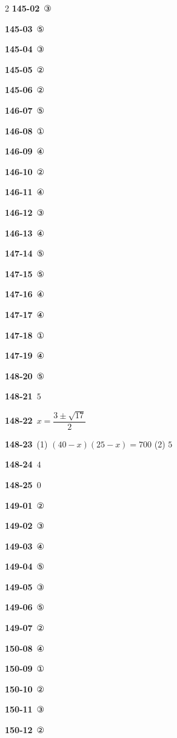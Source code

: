\documentclass[10pt,a4paper]{article}
\begin{document}
\begin{multicols}{2}
\noindent\textbf{145-02}\ ③\par
\noindent\textbf{145-03}\ ⑤\par
\noindent\textbf{145-04}\ ③\par
\noindent\textbf{145-05}\ ②\par
\noindent\textbf{145-06}\ ②\par
\noindent\textbf{146-07}\ ⑤\par
\noindent\textbf{146-08}\ ①\par
\noindent\textbf{146-09}\ ④\par
\noindent\textbf{146-10}\ ②\par
\noindent\textbf{146-11}\ ④\par
\noindent\textbf{146-12}\ ③\par
\noindent\textbf{146-13}\ ④\par
\noindent\textbf{147-14}\ ⑤\par
\noindent\textbf{147-15}\ ⑤\par
\noindent\textbf{147-16}\ ④\par
\noindent\textbf{147-17}\ ④\par
\noindent\textbf{147-18}\ ①\par
\noindent\textbf{147-19}\ ④\par
\noindent\textbf{148-20}\ ⑤\par
\noindent\textbf{148-21}\ $5$\par
\noindent\textbf{148-22}\ $x=\dfrac{3\pm\sqrt{17}}{2}$\par
\noindent\textbf{148-23}\ (1) $(40-x)(25-x)=700$ (2) $5$\par
\noindent\textbf{148-24}\ $4$\par
\noindent\textbf{148-25}\ $0$\par
\noindent\textbf{149-01}\ ②\par
\noindent\textbf{149-02}\ ③\par
\noindent\textbf{149-03}\ ④\par
\noindent\textbf{149-04}\ ⑤\par
\noindent\textbf{149-05}\ ③\par
\noindent\textbf{149-06}\ ⑤\par
\noindent\textbf{149-07}\ ②\par
\noindent\textbf{150-08}\ ④\par
\noindent\textbf{150-09}\ ①\par
\noindent\textbf{150-10}\ ②\par
\noindent\textbf{150-11}\ ③\par
\noindent\textbf{150-12}\ ②\par

\end{multicols}
\end{document}
